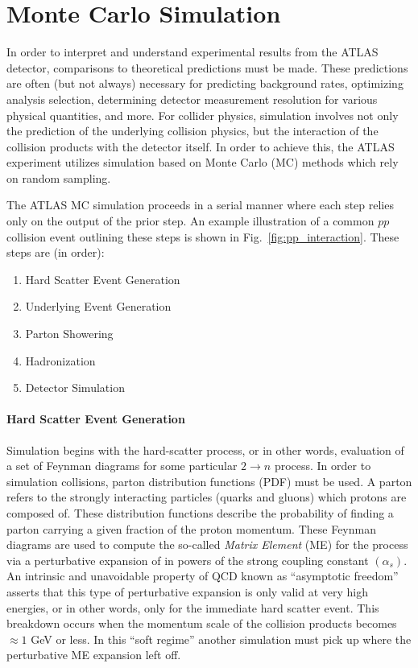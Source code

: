 \section{Monte Carlo Simulation}
\label{sec:monte_carlo}
In order to interpret and understand experimental results from the ATLAS detector, comparisons to theoretical predictions must be made.
These predictions are often (but not always) necessary for predicting background rates, optimizing analysis selection, determining detector measurement resolution for various physical quantities, and more.
For collider physics, simulation involves not only the prediction of the underlying collision physics, but the interaction of the collision products with the detector itself.
In order to achieve this, the ATLAS experiment utilizes simulation based on Monte Carlo (MC) methods which rely on random sampling.

The ATLAS MC simulation proceeds in a serial manner where each step relies only on the output of the prior step.
An example illustration of a common $pp$ collision event outlining these steps is shown in Fig.~\ref{fig:pp_interaction}.
These steps are (in order): %
\begin{enumerate}
    \itemsep0em 
    \item Hard Scatter Event Generation
    \item Underlying Event Generation
    \item Parton Showering
    \item Hadronization
    \item Detector Simulation
\end{enumerate}

\paragraph{\textbf{Hard Scatter Event Generation}}
Simulation begins with the hard-scatter process, or in other words, evaluation of a set of Feynman diagrams for some particular $2 \rightarrow n$ process.
In order to simulation collisions, parton distribution functions (PDF) must be used.
A parton refers to the strongly interacting particles (quarks and gluons) which protons are composed of.
These distribution functions describe the probability of finding a parton carrying a given fraction of the proton momentum.
These Feynman diagrams are used to compute the so-called \textit{Matrix Element} (ME) for the process via a perturbative expansion of in powers of the strong coupling constant $(\alpha_s)$.
An intrinsic and unavoidable property of QCD known as ``asymptotic freedom'' asserts that this type of perturbative expansion is only valid at very high energies, or in other words, only for the immediate hard scatter event.
This breakdown occurs when the momentum scale of the collision products becomes $\approx 1$ GeV or less.
In this ``soft regime'' another simulation must pick up where the perturbative ME expansion left off.

